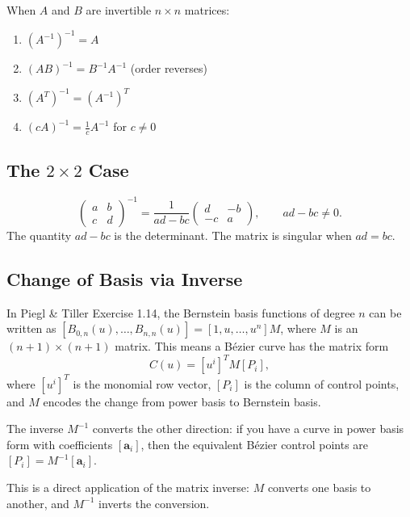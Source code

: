 \begin{tcolorbox}[colback=thmbox, colframe=thmborder, arc=2pt,
  left=6pt, right=6pt, top=4pt, bottom=4pt,
  title={\small\textbf{Theorem (Properties of Inverses)}},
  fonttitle=\small\bfseries]
When $A$ and $B$ are invertible $n \times n$ matrices:
\begin{enumerate}
  \item $(A^{-1})^{-1} = A$
  \item $(AB)^{-1} = B^{-1}A^{-1}$ \quad (order reverses)
  \item $(A^T)^{-1} = (A^{-1})^T$
  \item $(cA)^{-1} = \tfrac{1}{c} A^{-1}$ for $c \neq 0$
\end{enumerate}
\end{tcolorbox}

\subsection{The $2 \times 2$ Case}

\begin{tcolorbox}[colback=gray!6, colframe=gray!40, arc=2pt,
  left=6pt, right=6pt, top=4pt, bottom=4pt,
  title={\small\textbf{Formula ($2 \times 2$ Inverse)}},
  fonttitle=\small\bfseries]
\[
  \begin{pmatrix} a & b \\ c & d \end{pmatrix}^{-1}
  = \frac{1}{ad - bc} \begin{pmatrix} d & -b \\ -c & a \end{pmatrix},
  \qquad ad - bc \neq 0.
\]
The quantity $ad - bc$ is the determinant. The matrix is singular when $ad = bc$.
\end{tcolorbox}

\subsection{Change of Basis via Inverse}

\begin{remark*}
In Piegl \& Tiller Exercise 1.14, the Bernstein basis functions of degree $n$
can be written as $[B_{0,n}(u), \ldots, B_{n,n}(u)] = [1, u, \ldots, u^n] M$,
where $M$ is an $(n+1) \times (n+1)$ matrix.
This means a Bézier curve has the matrix form
\[
  C(u) = [u^i]^T M [P_i],
\]
where $[u^i]^T$ is the monomial row vector, $[P_i]$ is the column of control points,
and $M$ encodes the change from power basis to Bernstein basis.

The inverse $M^{-1}$ converts the other direction: if you have a curve in
power basis form with coefficients $[\mathbf{a}_i]$, then the equivalent
Bézier control points are $[P_i] = M^{-1}[\mathbf{a}_i]$.

This is a direct application of the matrix inverse: $M$ converts one basis
to another, and $M^{-1}$ inverts the conversion.
\end{remark*}

